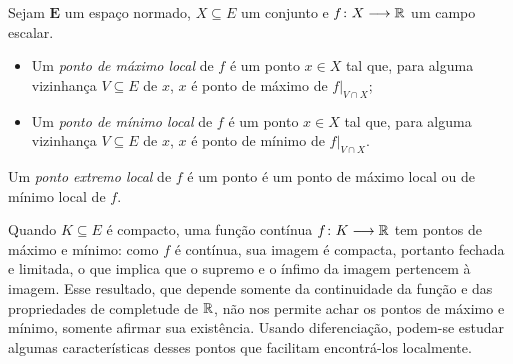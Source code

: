 \begin{definition}
Sejam $\bm E$ um espaço normado, $X \subseteq E$ um conjunto e ${f}\colon {X} \longrightarrow {\mathbb{R}}$ um campo escalar.
	\begin{itemize}
	\item Um \emph{ponto de máximo local} de $f$ é um ponto $x \in X$ tal que, para alguma vizinhança $V \subseteq E$ de $x$, $x$ é ponto de máximo de $f|_{V \cap X}$;
	\item Um \emph{ponto de mínimo local} de $f$ é um ponto $x \in X$ tal que, para alguma vizinhança $V \subseteq E$ de $x$, $x$ é ponto de mínimo de $f|_{V \cap X}$.
	\end{itemize}
Um \emph{ponto extremo local} de $f$ é um ponto é um ponto de máximo local ou de mínimo local de $f$.
\end{definition}

Quando $K \subseteq E$ é compacto, uma função contínua ${f}\colon {K} \longrightarrow {\mathbb{R}}$ tem pontos de máximo e mínimo: como $f$ é contínua, sua imagem é compacta, portanto fechada e limitada, o que implica que o supremo e o ínfimo da imagem pertencem à imagem. Esse resultado, que depende somente da continuidade da função e das propriedades de completude de $\mathbb{R}$, não nos permite achar os pontos de máximo e mínimo, somente afirmar sua existência. Usando diferenciação, podem-se estudar algumas características desses pontos que facilitam encontrá-los localmente.

\begin{comment}
Lembremos que o $d$-simplexo unitário (ou simplexo unitário $d$-dimensional) real é o conjunto
	\begin{align*}
	\Sx^d &= \set{x \in \R_{\geq}^{d+1}}{\sum_{k \in [d+1]} x_k = 1} \\
		&= \set{x \in \R_{\geq}^{d+1}}{\nor{x}_1 = 1}.
	\end{align*}
ou seja, os pontos $x = (x_0,\ldots,x_d) \in \R^{d+1}$ tais que, para todo $k \in [d+1]$, $x_k \geq 0$ e satisfazendo $\sum_{k \in [d+1]} x_k = 1$.

Dados um espaço normado $\bm E$ e $v_0, \ldots, v_d \in E$ tais que $\{v_1 - v_0,\ldots, v_d-v_0\}$ é linearmente independente, o simplexo gerado por esses vetores é o conjunto
	\begin{equation*}
	\Sxger[d]{v_0, \ldots, v_d} = \set{\sum_{k \in [d+1]} x_k v_k = 1}{x \in \Sx^d}
	\end{equation*}
e o interior desse simplexo é
	\begin{equation*}
	\Sxgera[d]{v_0, \ldots, v_d} = \set{\sum_{k \in [d+1]} x_k v_k = 1}{x \in \Sx^d}.
	\end{equation*}

Em particular, o $1$-simplexo é o conjunto $\simp^1 = \set{(1-t,t)}{t \in \intff{0}{1}}$ e dados $v,v' \in E$,
	\begin{equation*}
	\Sxger{v,v'} = \set{(1-t)v + tv'}{t \in \intff{0}{1}}
	\end{equation*}
e o interior desse simplexo é
	\begin{equation*}
	\Sxgera{v,v'} = \set{(1-t)v + tv'}{t \in \intaa{0}{1}}.
	\end{equation*}
\end{comment}


